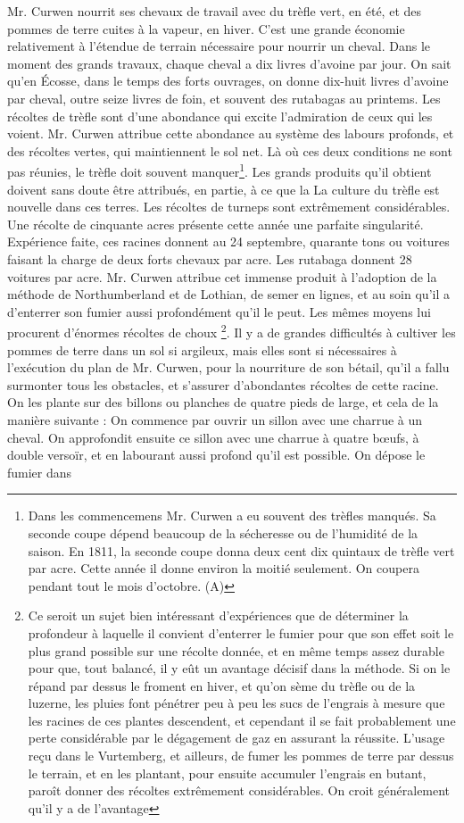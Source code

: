 Mr. Curwen nourrit ses chevaux de travail avec du trèfle vert, en été, et des pommes de terre cuites à la vapeur, en hiver. C'est une grande économie relativement à l'étendue de terrain nécessaire pour nourrir un cheval. Dans le moment des grands travaux, chaque cheval a dix livres d'avoine par jour. On sait qu'en Écosse, dans le temps des forts ouvrages, on donne dix-huit livres d'avoine par cheval, outre seize livres de foin, et souvent des rutabagas au printems.
Les récoltes de trèfle sont d'une abondance qui excite l'admiration de ceux qui les voient. Mr. Curwen attribue cette abondance au système des labours profonds, et des récoltes vertes, qui maintiennent le sol net. Là où ces deux conditions ne sont pas réunies, le trèfle doit souvent manquer\footnote{Dans les commencemens Mr. Curwen a eu souvent des trèfles manqués. Sa seconde coupe dépend beaucoup de la sécheresse ou de l'humidité de la saison. En 1811, la seconde coupe donna deux cent dix quintaux de trèfle vert par acre. Cette année il donne environ la moitié seulement. On coupera pendant tout le mois d'octobre. (A)}. Les grands produits qu'il obtient doivent sans doute être attribués, en partie, à ce que la\setcounter{page}{211} La culture du trèfle est nouvelle dans ces terres. Les récoltes de turneps sont extrêmement considérables. Une récolte de cinquante acres présente cette année une parfaite singularité. Expérience faite, ces racines donnent au 24 septembre, quarante tons ou voitures faisant la charge de deux forts chevaux par acre. Les rutabaga donnent 28 voitures par acre. Mr. Curwen attribue cet immense produit à l'adoption de la méthode de Northumberland et de Lothian, de semer en lignes, et au soin qu'il a d'enterrer son fumier aussi profondément qu'il le peut. Les mêmes moyens lui procurent d'énormes récoltes de choux \footnote{Ce seroit un sujet bien intéressant d'expériences que de déterminer la profondeur à laquelle il convient d'enterrer le fumier pour que son effet soit le plus grand possible sur une récolte donnée, et en même temps assez durable pour que, tout balancé, il y eût un avantage décisif dans la méthode. Si on le répand par dessus le froment en hiver, et qu'on sème du trèfle ou de la luzerne, les pluies font pénétrer peu à peu les sucs de l'engrais à mesure que les racines de ces plantes descendent, et cependant il se fait probablement une perte considérable par le dégagement de gaz en assurant la réussite. L'usage reçu dans le Vurtemberg, et ailleurs, de fumer les pommes de terre par dessus le terrain, et en les plantant, pour ensuite accumuler l'engrais en butant, paroît donner des récoltes extrêmement considérables. On croit généralement qu'il y a de l'avantage}.\setcounter{page}{212} Il y a de grandes difficultés à cultiver les pommes de terre dans un sol si argileux, mais elles sont si nécessaires à l’exécution du plan de Mr. Curwen, pour la nourriture de son bétail, qu’il a fallu surmonter tous les obstacles, et s’assurer d’abondantes récoltes de cette racine. On les plante sur des billons ou planches de quatre pieds de large, et cela de la manière suivante : On commence par ouvrir un sillon avec une charrue à un cheval. On approfondit ensuite ce sillon avec une charrue à quatre bœufs, à double versoïr, et en labourant aussi profond qu’il est possible. On dépose le fumier dans 